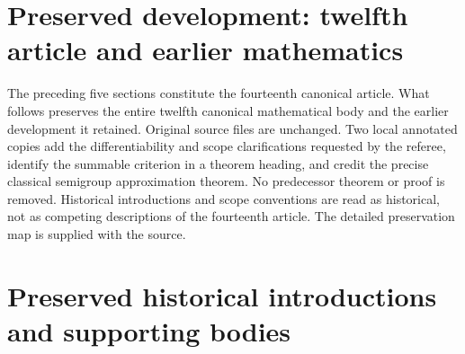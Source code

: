 \newif\ifcomplete\completetrue


\clearpage
\section*{Preserved development: twelfth article and earlier mathematics}
The preceding five sections constitute the fourteenth canonical article.
What follows preserves the entire twelfth canonical mathematical body
and the earlier development it retained. Original source files are
unchanged. Two local annotated copies add the differentiability and
scope clarifications requested by the referee, identify the summable
criterion in a theorem heading, and credit the precise classical
semigroup approximation theorem. No predecessor theorem or proof is
removed. Historical introductions and scope conventions are read as
historical, not as competing descriptions of the fourteenth article.
The detailed preservation map is supplied with the source.

\clearpage
\section*{Preserved historical introductions and supporting bodies}
























